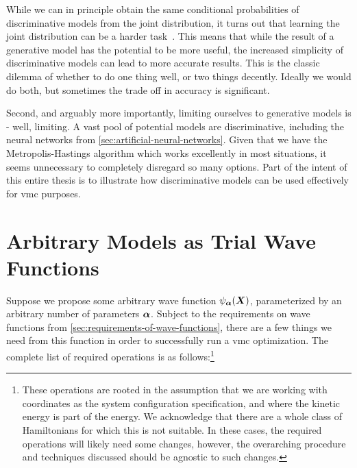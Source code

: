 \documentclass[Thesis.tex]{subfiles}
\begin{document}
While we can in principle obtain the same conditional probabilities of
discriminative models from the joint distribution, it turns out that learning
the joint distribution can be a harder task~\cite{Ng-2001}. This means that
while the result of a generative model has the potential to be more useful, the
increased simplicity of discriminative models can lead to more accurate results.
This is the classic dilemma of whether to do one thing well, or two things
decently. Ideally we would do both, but sometimes the trade off in accuracy is
significant.

Second, and arguably more importantly, limiting ourselves to generative models
is - well, limiting. A vast pool of potential models are discriminative,
including the neural networks from \cref{sec:artificial-neural-networks}. Given
that we have the Metropolis-Hastings algorithm which works excellently in
most situations, it seems unnecessary to completely disregard so many options.
Part of the intent of this entire thesis is to illustrate how discriminative
models can be used effectively for \gls{vmc} purposes.


\section{Arbitrary Models as Trial Wave Functions}
\label{sec:arbitrary-models-as-trial-wave-functions}

Suppose we propose some arbitrary wave function $\psi_{\bm{\alpha}}(\bm{X})$, parameterized
by an arbitrary number of parameters $\bm{\alpha}$. Subject to the
requirements on wave functions from \cref{sec:requirements-of-wave-functions},
there are a few things we need from this function in order to successfully run a
\gls{vmc} optimization. The complete list of required operations is as
follows:\footnote{These operations are rooted in the assumption that we are
  working with coordinates as the system configuration specification, and where
  the kinetic energy is part of the energy. We acknowledge that there are a
  whole class of Hamiltonians for which this is not suitable. In these cases,
  the required operations will likely need some changes, however, the overarching
  procedure and techniques discussed should be agnostic to such changes.}
\end{document}
